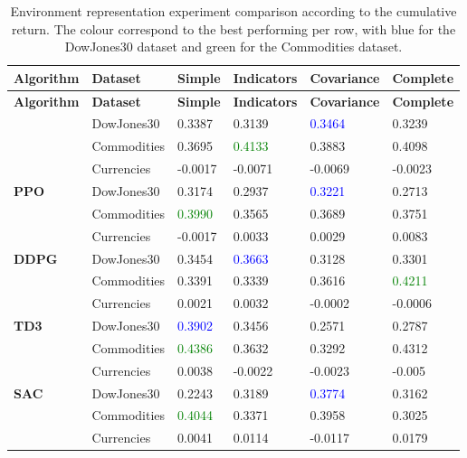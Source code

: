 \begin{longtable}{|p{2cm}|p{2.2cm}|p{2cm}|p{2cm}|p{2.2cm}|p{2cm}|}
    \hline
    \textbf{Algorithm} & \textbf{Dataset} & \textbf{Simple} & \textbf{Indicators} & \textbf{Covariance} & \textbf{Complete} \\ \midrule
    \endfirsthead

    \hline
    \textbf{Algorithm} & \textbf{Dataset} & \textbf{Simple} & \textbf{Indicators} & \textbf{Covariance} & \textbf{Complete}  \\ \midrule
    \endhead

    \caption{Environment representation experiment comparison according to the cumulative return. The colour correspond to the best performing per row, with blue for the DowJones30 dataset and green for the Commodities dataset.}
    \label{tab:experiment_environment_cumulative}

    \endfoot

    \hline  
    \multirow{3}{*}{\textbf{A2C}}
    & DowJones30 & 0.3387 & 0.3139 & \textcolor{blue}{0.3464} & 0.3239 \\ \cline{2-6}
    & Commodities & 0.3695 & \textcolor{green}{0.4133} & 0.3883 & 0.4098 \\ \cline{2-6}
    & Currencies & -0.0017 & -0.0071 & -0.0069 & -0.0023 \\ \midrule

    \multirow{3}{*}{\textbf{PPO}}
    & DowJones30 & 0.3174 & 0.2937 & \textcolor{blue}{0.3221} & 0.2713 \\ \cline{2-6}
    & Commodities & \textcolor{green}{0.3990} & 0.3565 & 0.3689 & 0.3751 \\ \cline{2-6}
    & Currencies & -0.0017 & 0.0033 & 0.0029 & 0.0083 \\ \midrule

    \multirow{3}{*}{\textbf{DDPG}}
    & DowJones30 & 0.3454 & \textcolor{blue}{0.3663} & 0.3128 & 0.3301 \\ \cline{2-6}
    & Commodities & 0.3391 & 0.3339 & 0.3616 & \textcolor{green}{0.4211} \\ \cline{2-6}
    & Currencies & 0.0021 & 0.0032 & -0.0002 & -0.0006 \\ \midrule

    \multirow{3}{*}{\textbf{TD3}}
    & DowJones30 & \textcolor{blue}{0.3902} & 0.3456 & 0.2571 & 0.2787 \\ \cline{2-6}
    & Commodities & \textcolor{green}{0.4386} & 0.3632 & 0.3292 & 0.4312 \\ \cline{2-6}
    & Currencies & 0.0038 & -0.0022 & -0.0023 & -0.005 \\ \midrule

    \multirow{3}{*}{\textbf{SAC}}
    & DowJones30 & 0.2243 & 0.3189 & \textcolor{blue}{0.3774} & 0.3162 \\ \cline{2-6}
    & Commodities & \textcolor{green}{0.4044} & 0.3371 & 0.3958 & 0.3025 \\ \cline{2-6}
    & Currencies & 0.0041 & 0.0114 & -0.0117 & 0.0179 \\ \midrule
\end{longtable}